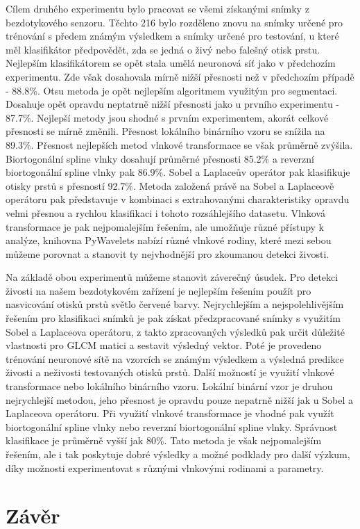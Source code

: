 Cílem druhého experimentu bylo pracovat se všemi získanými snímky z bezdotykového senzoru. Těchto 216 bylo rozděleno znovu na snímky určené pro trénování s předem známým výsledkem a snímky určené pro testování, u které měl klasifikátor předpovědět, zda se jedná o živý nebo falešný otisk prstu. Nejlepším klasifikátorem se opět stala umělá neuronová síť jako v předchozím experimentu. Zde však dosahovala mírně nižší přesnosti než v předchozím případě - 88.8\%. Otsu metoda je opět nejlepším algoritmem využitým pro segmentaci. Dosahuje opět opravdu neptatrně nižší přesnosti jako u prvního experimentu - 87.7\%. Nejlepší metody jsou shodné s prvním experimentem, akorát celkové přesnosti se mírně změnili. Přesnost lokálního binárního vzoru se snížila na 89.3\%. Přesnost nejlepších metod vlnkové transformace se však průměrně zvýšila. Biortogonální spline vlnky dosahují průměrné přesnosti 85.2\% a reverzní biortogonální spline vlnky pak 86.9\%. Sobel a Laplaceův operátor pak klasifikuje otisky prstů s přesností 92.7\%. Metoda založená právě na Sobel a Laplaceově operátoru pak představuje v kombinaci s extrahovanými charakteristiky opravdu velmi přesnou a rychlou klasifikaci i tohoto rozsáhlejšího datasetu. Vlnková transformace je pak nejpomalejším řešením, ale umožňuje různé přístupy k analýze, knihovna PyWavelets nabízí různé vlnkové rodiny, které mezi sebou můžeme porovnat a stanovit ty nejvhodnější pro zkoumanou detekci živosti.

Na základě obou experimentů můžeme stanovit záverečný úsudek. Pro detekci živosti na našem bezdotykovém zařízení je nejlepším řešením použít pro nasvicování otisků prstů světlo červené barvy. Nejrychlejším a nejspolehlivějším řešením pro klasifikaci snímků je pak získat předzpracované snímky s využitím Sobel a Laplaceova operátoru, z takto zpracovaných výsledků pak určit důležité vlastnosti pro GLCM matici a sestavit výsledný vektor. Poté je provedeno trénování neuronové sítě na vzorcích se známým výsledkem a výsledná predikce živosti a neživosti testovaných otisků prstů. Další možností je využití vlnkové transformace nebo lokálního binárního vzoru. Lokální binární vzor je druhou nejrychlejší metodou, jeho přesnost je opravdu pouze nepatrně nižší jak u Sobel a Laplaceova operátoru. Při využití vlnkové transformace je vhodné pak využít biortogonální spline vlnky nebo reverzní biortogonální spline vlnky. Správnost klasifikace je průměrně vyšší jak 80\%. Tato metoda je však nejpomalejším řešením, ale i tak poskytuje dobré výsledky a možné podklady pro další výzkum, díky možnosti experimentovat s různými vlnkovými rodinami a parametry.






\label{citace}



\chapter{Závěr}
 

\label{zaver}


